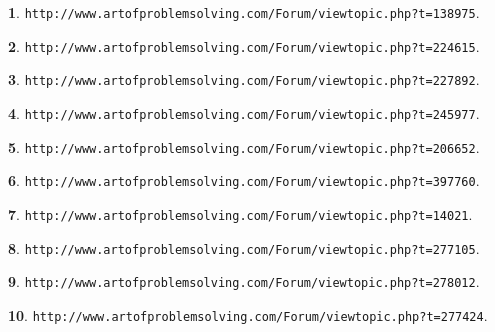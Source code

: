 \documentclass{article}
\theoremstyle{definition}
\newtheorem{s}{}
\begin{document}
\begin{s}
\texttt{http://www.artofproblemsolving.com/Forum/viewtopic.php?t=138975}.
\end{s}




\begin{s}
\texttt{http://www.artofproblemsolving.com/Forum/viewtopic.php?t=224615}.
\end{s}




\begin{s}
\texttt{http://www.artofproblemsolving.com/Forum/viewtopic.php?t=227892}.
\end{s}





\begin{s}
\texttt{http://www.artofproblemsolving.com/Forum/viewtopic.php?t=245977}.
\end{s}




\begin{s}
\texttt{http://www.artofproblemsolving.com/Forum/viewtopic.php?t=206652}.
\end{s}




\begin{s}
\texttt{http://www.artofproblemsolving.com/Forum/viewtopic.php?t=397760}.
\end{s}





\begin{s}
\texttt{http://www.artofproblemsolving.com/Forum/viewtopic.php?t=14021}.
\end{s}




\begin{s}
\texttt{http://www.artofproblemsolving.com/Forum/viewtopic.php?t=277105}.
\end{s}




\begin{s}
\texttt{http://www.artofproblemsolving.com/Forum/viewtopic.php?t=278012}.
\end{s}





\begin{s}
\texttt{http://www.artofproblemsolving.com/Forum/viewtopic.php?t=277424}.
\end{s}
\end{document}
